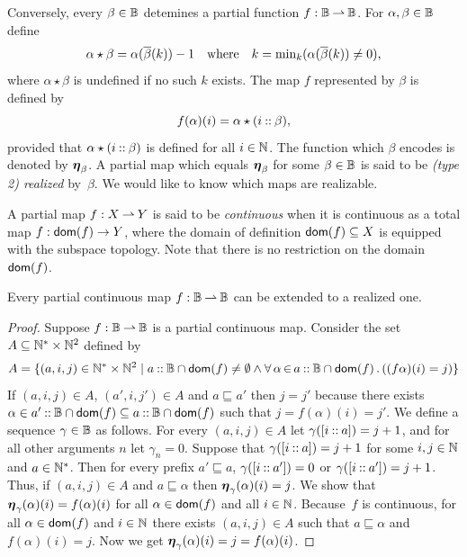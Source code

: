 Conversely, every $\beta \in \mathbb{B}$ detemines a partial function $f :
\mathbb{B} \mathbin{\rightharpoonup} \mathbb{B}$. For $\alpha, \beta \in \mathbb{B}$ define
%
\begin{equation*}
  \alpha \star \beta = \alpha(\overline{\beta}(k)) - 1
  \quad\text{where}\quad
  k = \min\nolimits_k (\alpha(\overline{\beta}(k)) \neq 0),
\end{equation*}
%
where $\alpha \star \beta$ is undefined if no such $k$ exists. The map
$f$ represented by $\beta$ is defined by
\begin{equation}
  \label{eq:type2-encoding}
  f(\alpha)(i) = \alpha \star (i \mathbin{{:}{:}} \beta),
\end{equation}
%
provided that $\alpha \star (i \mathbin{{:}{:}} \beta)$ is defined for all $i
\in \mathbb{N}$. The function which $\beta$ encodes is denoted by
$\text{\boldmath{$\eta$}}_\beta$. A partial map which equals $\text{\boldmath{$\eta$}}_\beta$ for some
$\beta \in \mathbb{B}$ is said to be \emph{(type 2) realized} by~$\beta$.
We would like to know which maps are realizable.

A partial map $f: X \mathbin{\rightharpoonup} Y$ is said to be \emph{continuous}
when it is continuous as a total map $f: \mathsf{dom}(f) \to Y$, where the
domain of definition $\mathsf{dom}(f) \subseteq X$ is equipped with the
subspace topology. Note that there is no restriction on the
domain~$\mathsf{dom}(f)$.

\begin{theorem}
  \label{th:extension_BB}%
  Every partial continuous map $f: \mathbb{B} \mathbin{\rightharpoonup} \mathbb{B}$ can be extended
  to a realized one.
\end{theorem}

\begin{proof}
  Suppose $f: \mathbb{B} \mathbin{\rightharpoonup} \mathbb{B}$ is a partial continuous map.  Consider
  the set $A \subseteq \mathbb{N}^{*} \times \mathbb{N}^2$ defined by
  \begin{equation*}
     A = \{(a, i, j) \in \mathbb{N}^{*} \times \mathbb{N}^{2} \mid
        a \mathbin{{:}{:}} \mathbb{B} \cap \mathsf{dom}(f) \neq \emptyset \land
        \forall\, \alpha \,{\in}\, a \mathbin{{:}{:}} \mathbb{B} \cap \mathsf{dom}(f)\,.\left(
          (f\alpha)(i) = j
          \right)
        \}
  \end{equation*}
  If $(a, i, j) \in A$, $(a', i, j') \in A$ and $a \sqsubseteq a'$
  then $j = j'$ because there exists $\alpha \in a' \mathbin{{:}{:}} \mathbb{B}
  \cap \mathsf{dom}(f) \subseteq a \mathbin{{:}{:}} \mathbb{B} \cap \mathsf{dom}(f)$ such that $j =
  f(\alpha)(i) = j'$. We define a sequence $\gamma \in \mathbb{B}$ as
  follows. For every $(a, i, j) \in A$ let $\gamma([i \mathbin{{:}{:}} a]) =
  j + 1$, and for all other arguments $n$ let $\gamma_n = 0$. Suppose
  that $\gamma([i \mathbin{{:}{:}} a]) = j + 1$ for some $i, j \in \mathbb{N}$ and
  $a \in \mathbb{N}^{*}$. Then for every prefix $a' \sqsubseteq a$,
  $\gamma([i \mathbin{{:}{:}} a']) = 0$ or $\gamma([i \mathbin{{:}{:}} a']) = j +
  1$. Thus, if $(a, i, j) \in A$ and $a \sqsubseteq \alpha$ then
  $\text{\boldmath{$\eta$}}_{\gamma}(\alpha)(i) = j$.
  We show that $\text{\boldmath{$\eta$}}_{\gamma}(\alpha)(i) = f(\alpha)(i)$ for all
  $\alpha \in \mathsf{dom}(f)$ and all $i \in \mathbb{N}$. Because~$f$ is continuous,
  for all $\alpha \in \mathsf{dom}(f)$ and $i \in \mathbb{N}$ there exists $(a, i, j)
  \in A$ such that $a \sqsubseteq \alpha$ and $f(\alpha)(i) = j$. Now
  we get
  $
    \text{\boldmath{$\eta$}}_{\gamma}(\alpha)(i)
    = j
    = f(\alpha)(i)
  $.
\end{proof}

